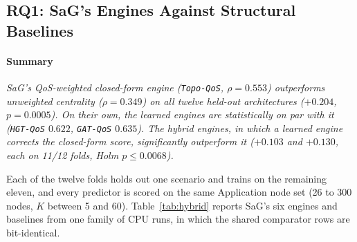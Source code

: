 \documentclass[preprint,3p]{elsarticle}
\begin{document}
\subsection{RQ1: SaG's Engines Against Structural Baselines}
\label{sec:rq1}
\label{sec:rq1-loso}

\paragraph{Summary} \emph{SaG's QoS-weighted closed-form engine (\texttt{Topo-QoS}, $\rho = 0.553$) outperforms unweighted centrality ($\rho = 0.349$) on all twelve held-out architectures ($+0.204$, $p = 0.0005$). On their own, the learned engines are statistically on par with it (\texttt{HGT-QoS} $0.622$, \texttt{GAT-QoS} $0.635$). The hybrid engines, in which a learned engine corrects the closed-form score, significantly outperform it ($+0.103$ and $+0.130$, each on 11/12 folds, Holm $p \le 0.0068$).}

Each of the twelve folds holds out one scenario and trains on the remaining eleven, and every predictor is scored on the same Application node set (26 to 300 nodes, $K$ between 5 and 60). Table~\ref{tab:hybrid} reports SaG's six engines and baselines from one family of CPU runs, in which the shared comparator rows are bit-identical.
\end{document}
